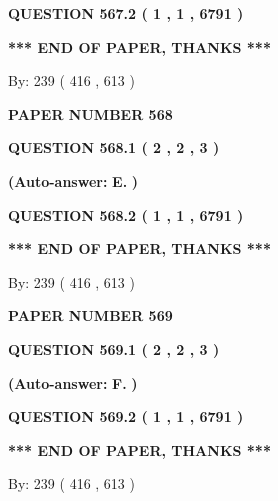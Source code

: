 \documentclass[12pt]{article}
\begin{document}
 
  
  
{\textbf{\large{QUESTION
567.2 
 ( 1 , 1 , 6791 )
}}}
   
   
   
   
\vspace{1.0in} 
{\textbf{\large{ *** END OF PAPER, THANKS *** }}} 
   
   
\hspace{1.0in} By: 
 239 ( 416 ,  613 )
   
   
   
   
\newpage 
\setcounter{page}{ 
   568001 } 
   
   
 {\textbf{ \Large{ PAPER NUMBER  568  }}}
   
   
   
   
  
  
{\textbf{\large{QUESTION
568.1 
 ( 2 , 2 , 3 )
}}}
 
 
{\textbf{(Auto-answer:}}
{\textbf{\large{
E.}}}
{\textbf{)}}
 
 
  
  
{\textbf{\large{QUESTION
568.2 
 ( 1 , 1 , 6791 )
}}}
   
   
   
   
\vspace{1.0in} 
{\textbf{\large{ *** END OF PAPER, THANKS *** }}} 
   
   
\hspace{1.0in} By: 
 239 ( 416 ,  613 )
   
   
   
   
\newpage 
\setcounter{page}{ 
   569001 } 
   
   
 {\textbf{ \Large{ PAPER NUMBER  569  }}}
   
   
   
   
  
  
{\textbf{\large{QUESTION
569.1 
 ( 2 , 2 , 3 )
}}}
 
 
{\textbf{(Auto-answer:}}
{\textbf{\large{
F.}}}
{\textbf{)}}
 
 
  
  
{\textbf{\large{QUESTION
569.2 
 ( 1 , 1 , 6791 )
}}}
   
   
   
   
\vspace{1.0in} 
{\textbf{\large{ *** END OF PAPER, THANKS *** }}} 
   
   
\hspace{1.0in} By: 
 239 ( 416 ,  613 )
   
   
   
   
\newpage 
\setcounter{page}{ 
   570001 } 
   
\end{document}
